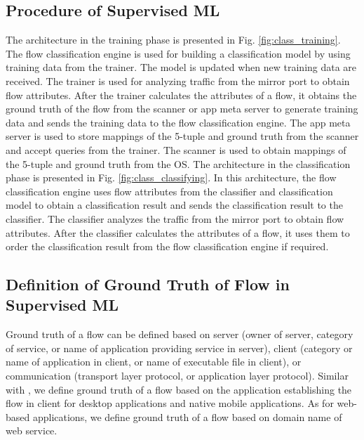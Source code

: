 \documentclass[10pt,journal]{IEEEtran}
\begin{document}
\subsection{Procedure of Supervised ML}
The architecture in the training phase is presented in Fig. \ref{fig:class_training}. The flow classification engine is used for building a classification model by using training data from the trainer. The model is updated when new training data are received. The trainer is used for analyzing traffic from the mirror port to obtain flow attributes. After the trainer calculates the attributes of a flow, it obtains the ground truth of the flow from the scanner or app meta server to generate training data and sends the training data to the flow classification engine. The app meta server is used to store mappings of the 5-tuple and ground truth from the scanner and accept queries from the trainer. The scanner is used to obtain mappings of the 5-tuple and ground truth from the OS. The architecture in the classification phase is presented in Fig. \ref{fig:class_classifying}. In this architecture, the flow classification engine uses flow attributes from the classifier and classification model to obtain a classification result and sends the classification result to the classifier. The classifier analyzes the traffic from the mirror port to obtain flow attributes. After the classifier calculates the attributes of a flow, it uses them to order the classification result from the flow classification engine if required.



\subsection{Definition of Ground Truth of Flow in Supervised ML}
Ground truth of a flow can be defined based on server (owner of server, category of service, or name of application providing service in server), client (category or name of application in client, or name of executable file in client), or communication (transport layer protocol, or application layer protocol). Similar with\cite{Qazi2013} \cite{Iwai2016}, we define ground truth of a flow based on the application establishing the flow in client for desktop applications and native mobile applications. As for web-based applications, we define ground truth of a flow based on domain name of web service.
\end{document}
